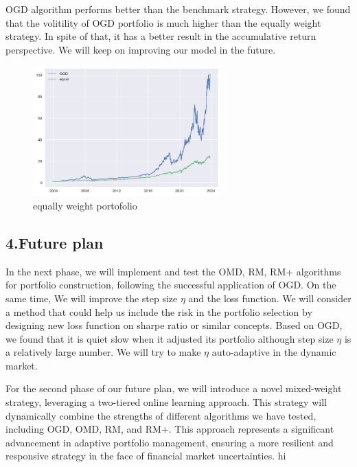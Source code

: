 \documentclass[]{report}
\begin{document}
OGD algorithm performs better than the benchmark strategy. However, we found that the volitility of OGD portfolio is much higher than the equally weight strategy. In spite of that, it has a better result in the accumulative return perspective. We will keep on improving our model in the future.

\begin{figure}[ht]
    \centering
    \includegraphics[height=5cm,keepaspectratio]{2.png}
    \caption{equally weight portofolio}
\label{fig:euqalweight}
\end{figure}
\subsection*{4.Future plan}
In the next phase, we will implement and test the OMD, RM, RM+ algorithms for portfolio construction, following the successful application of OGD. On the same time, We will improve the step size $\eta$ and the loss function. We will consider a method that could help us include the risk in the portfolio selection by designing new loss function on sharpe ratio or similar concepts. Based on OGD, we found that it is quiet slow when it adjusted its portfolio although step size $\eta$ is a relatively large number. We will try to make $\eta$ auto-adaptive in the dynamic market.

For the second phase of our future plan, we will introduce a novel mixed-weight strategy, leveraging a two-tiered online learning approach. This strategy will dynamically combine the strengths of different algorithms we have tested, including OGD, OMD, RM, and RM+.  This approach represents a significant advancement in adaptive portfolio management, ensuring a more resilient and responsive strategy in the face of financial market uncertainties.
hi
\printbibliography
\end{document}
